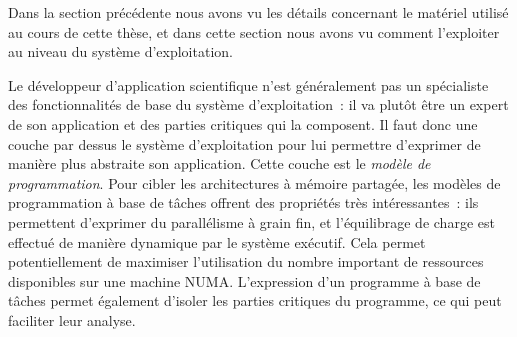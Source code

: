 \bigskip

Dans la section précédente nous avons vu les détails concernant le matériel utilisé au cours de cette thèse, et dans cette section nous avons vu comment l'exploiter au niveau du système d'exploitation.

Le développeur d'application scientifique n'est généralement pas un spécialiste des fonctionnalités de base du système d'exploitation~: il va plutôt être un expert de son application et des parties critiques qui la composent.
Il faut donc une couche par dessus le système d'exploitation pour lui permettre d'exprimer de manière plus abstraite son application. Cette couche est le \emph{modèle de programmation}.
Pour cibler les architectures à mémoire partagée, les modèles de programmation à base de tâches offrent des propriétés très intéressantes~: ils permettent d'exprimer du parallélisme à grain fin, et l'équilibrage de charge est effectué de manière dynamique par le système exécutif.
Cela permet potentiellement de maximiser l'utilisation du nombre important de ressources disponibles sur une machine NUMA.
L'expression d'un programme à base de tâches permet également d'isoler les parties critiques du programme, ce qui peut faciliter leur analyse.
